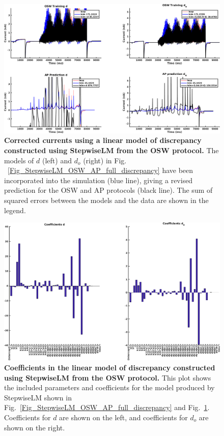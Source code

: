 \documentclass[11pt,a4paper,oneside]{article}
\begin{document}
\begin{figure}[hb]
\begin{center}
\includegraphics[scale=0.42]{Figures/StepwiseLM_OSW_AP_full_currents.png}
\caption{\textbf{Corrected currents using a linear model of discrepancy constructed using StepwiseLM from the OSW protocol.} The models of $d$ (left) and $d_o$ (right) in Fig. ~\ref{Fig_StepwiseLM_OSW_AP_full_discrepancy} have been incorporated into the simulation (blue line), giving a revised prediction for the OSW and AP protocols (black line). The sum of squared errors between the models and the data are shown in the legend.}
\label{Fig_StepwiseLM_OSW_AP_full_currents}
\end{center}
\end{figure}

\clearpage

\begin{figure}[t]
\begin{center}
\includegraphics[scale=0.42]{Figures/StepwiseLM_OSW_AP_full_coefficients.png}
\caption{\textbf{Coefficients in the linear model of discrepancy constructed using StepwiseLM from the OSW protocol.} This plot shows the included parameters and coefficients for the model produced by StepwiseLM shown in Fig.~\ref{Fig_StepwiseLM_OSW_AP_full_discrepancy} and Fig.~\ref{Fig_StepwiseLM_OSW_AP_full_currents}. Coefficients for $d$ are shown on the left, and coefficients for $d_o$ are shown on the right.} 
\label{Fig_StepwiseLM_OSW_AP_full_coefficients}
\end{center}
\end{figure}
\end{document}

